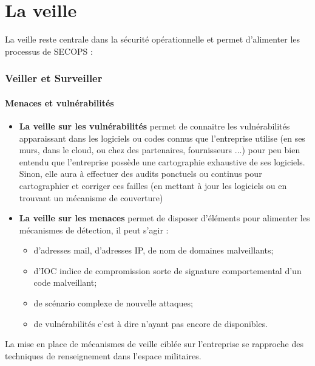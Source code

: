 \section{La veille}

La veille reste centrale dans la sécurité opérationnelle et permet d'alimenter les processus de SECOPS :

\begin{frame}
\frametitle<presentation>{Veiller et Surveiller}
\framesubtitle<presentation>{Menaces et vulnérabilités}
\begin{itemize}
  \item\textbf{ La veille sur les vulnérabilités} permet de connaitre les vulnérabilités apparaissant dans les logiciels ou codes connus que l'entreprise utilise (en ses murs, dans le cloud, ou chez des partenaires, fournisseurs ...) pour peu bien entendu que l'entreprise possède une cartographie exhaustive de ses logiciels. Sinon, elle aura à effectuer des audits ponctuels ou continus pour cartographier et corriger ces failles (en mettant à jour les logiciels ou en trouvant un mécanisme de couverture)
  \item  \textbf{La veille sur les menaces} permet de disposer d'éléments pour alimenter les mécanismes de détection, il peut s'agir :
\begin{itemize}
  \item  d'adresses mail, d'adresses IP, de nom de domaines malveillants;
  \item  d'IOC indice de compromission sorte de signature comportemental d'un code malveillant;
  \item de scénario complexe de nouvelle attaques;
  \item de vulnérabilités  c'est à dire n'ayant pas encore de  disponibles.
\end{itemize}
\end{itemize}
\end{frame}

La mise en place de mécanismes de veille ciblée sur l'entreprise se rapproche des techniques de renseignement dans l'espace militaires.

